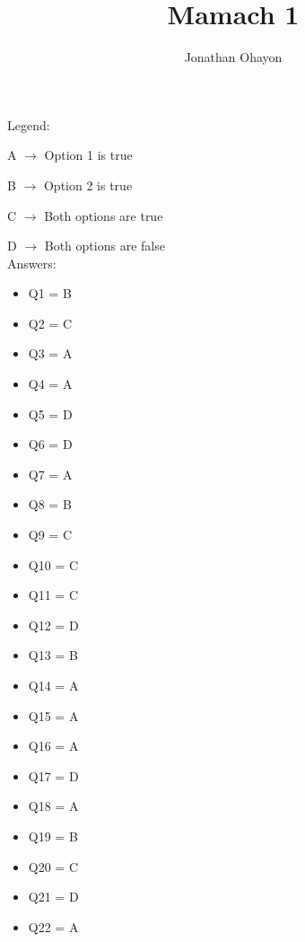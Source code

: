 \documentclass[12pt, oneside]{article}
\title{Mamach 1}
\author{Jonathan Ohayon}
\begin{document}
\maketitle

Legend:\par
A $\rightarrow$ Option 1 is true\par
B $\rightarrow$ Option 2 is true\par
C $\rightarrow$ Both options are true\par
D $\rightarrow$ Both options are false\\

Answers:
\begin{itemize}
\item Q1 = B
\item Q2 = C
\item Q3 = A
\item Q4 = A
\item Q5 = D
\item Q6 = D
\item Q7 = A
\item Q8 = B
\item Q9 = C
\item Q10 = C
\item Q11 = C
\item Q12 = D
\item Q13 = B
\item Q14 = A
\item Q15 = A
\item Q16 = A
\item Q17 = D
\item Q18 = A
\item Q19 = B
\item Q20 = C
\item Q21 = D
\item Q22 = A
\end{itemize}
\end{document}
